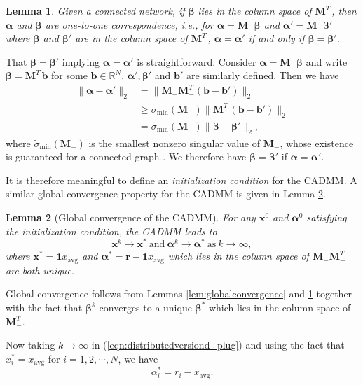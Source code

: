 \documentclass[journal]{IEEEtran}
\newtheorem{lemma}{Lemma}
\newcommand{\nn}{\nonumber}
\begin{document}
\begin{lemma}
\label{lem:abrelation}
Given a connected network, if $\bm\beta$ lies in the column space of $\bm M_-^T$, then $\bm \alpha$ and $\bm \beta$ are one-to-one correspondence, i.e., for $\bm\alpha = \bm M_-\bm\beta$ and $\bm\alpha'=\bm M_-\bm\beta'$ where $\bm\beta$ and $\bm\beta'$ are in the column space of $\bm M_-^T$, $\bm\alpha = \bm\alpha'$ if and only if $\bm\beta=\bm\beta'$.
\end{lemma}
\begin{IEEEproof}
That $\bm\beta=\bm\beta'$ implying $\bm\alpha=\bm\alpha'$ is straightforward. Consider $\bm\alpha=\bm M_-\bm\beta$ and write $\bm\beta=\bm M_-^T\bm b$  for some $\bm b\in\mathbb{R}^N$. $\bm\alpha', \bm\beta'$ and $\bm b'$ are similarly defined. Then we have 
\begin{align}
\|\bm\alpha-\bm\alpha'\|_2 
&=\|\bm M_-\bm M_-^T(\bm b-\bm b')\|_2\nn\\
&\geq\tilde{\sigma}_{\min}(\bm M_-)\|\bm M_-^T(\bm b-\bm b')\|_2\nn\\
&=\tilde{\sigma}_{\min}(\bm M_-)\|\bm\beta-\bm\beta'\|_2,\nn
\end{align}
where $\tilde{\sigma}_{\min}(\bm M_-)$ is the smallest nonzero singular value of $\bm M_-$, whose existence is guaranteed for a connected graph \cite{ChungSpectral}. We therefore have $\bm\beta=\bm\beta'$ if $\bm\alpha=\bm\alpha'$.
\end{IEEEproof}

It is therefore meaningful to define an \emph{initialization condition} for the CADMM. A similar global convergence property for the CADMM is given in Lemma \ref{lem:linearconvergence_DCADMM}.
\begin{center}
{}
\end{center}

\begin{lemma}[Global convergence of the CADMM]
\label{lem:linearconvergence_DCADMM}
For any $\bm x^0$ and $\bm \alpha^0$ satisfying the initialization condition, the CADMM leads to $$\bm x^k\to \bm x^*~\text{and}~\bm\alpha^k\to\bm\alpha^*~\text{as}~k\to\infty,$$
where $\bm x^*=\bm 1x_\text{avg}$ and $\bm \alpha^*=\bm r -\bm 1 x_{\text{avg}}$ which lies in the column space of $\bm M_-\bm M_-^T$ are both unique.
\end{lemma}
\begin{IEEEproof}
Global convergence follows from Lemmas \ref{lem:globalconvergence} and \ref{lem:abrelation} together with the fact that $\bm\beta^k$ converges to a unique $\bm\beta^*$ which lies in the column space of $\bm M_-^T$.

Now taking $k\to\infty$ in (\ref{eqn:distributedversiond_plug}) and using the fact that $x_i^*=x_\text{avg}$ for $i=1,2,\cdots,N$, we have $$\alpha_i^*=r_i-x_\text{avg}.$$
\end{IEEEproof}
\end{document}

